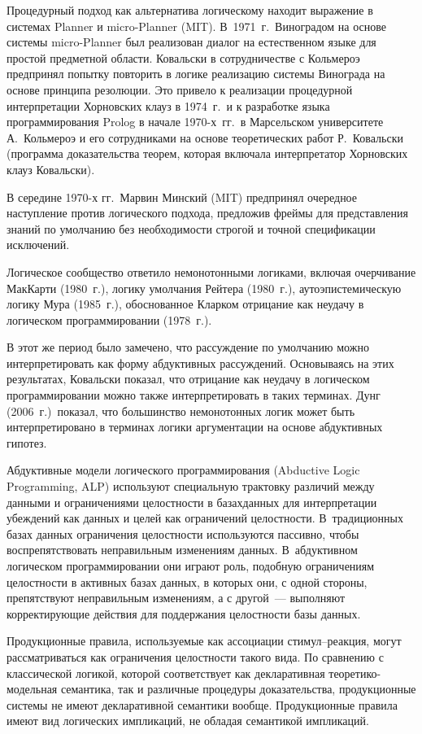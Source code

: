 \begin{multicols}{2}
Процедурный подход как альтернатива логическому находит выражение в системах Planner 
и micro-Planner (MIT). В~1971~г.\ Виноградом на основе системы micro-Planner был 
реализован диалог на естественном языке для простой предметной об\-ласти. Ковальски в 
сотрудничестве с Кольмероэ предпринял попытку повторить в логике реализацию 
системы Винограда на основе принципа резолюции. Это привело к реализации процедурной 
интерпретации Хорновских клауз в 1974~г.\ и к разработке языка программирования 
Prolog в начале 1970-х~гг.\ в Марсельском университете А.~Кольмероэ и его сотрудниками на 
основе теоретических работ Р.~Ковальски (программа доказательства теорем, которая 
включала интерпретатор Хорновских клауз Ковальски).

В середине 1970-х гг.\ Марвин Минский (MIT) предпринял очередное 
наступление против логического подхода, предложив фреймы для пред\-став\-ле\-ния знаний по 
умолчанию без необходимости строгой и точной спецификации исключений.

Логическое сообщество ответило немонотонными логиками, включая очерчивание 
МакКарти (1980~г.), логику умолчания Рейтера (1980~г.), аутоэпистемическую логику Мура 
(1985~г.), обоснованное Кларком отрицание как неудачу в логическом программировании 
(1978~г.).

В этот же период было замечено, что рассуждение по умолчанию можно интерпретировать 
как форму абдуктивных рассуждений. Основываясь на этих результатах, Ковальски показал, 
что отрицание как неудачу в логическом программировании можно также 
интерпретировать в таких терминах. Дунг (2006~г.)\ показал, что большинство 
немонотонных логик может быть интерпретировано в терминах логики аргументации на 
основе абдуктивных гипотез. 

Абдуктивные модели логического програм\-мирования 
(Abductive Logic Programming, ALP) 
используют специальную трактовку различий между данными и ограничениями 
целостности в базах\linebreak данных для интерпретации убеждений как данных и целей как 
ограничений целостности. В~традиционных базах данных ограничения целостности 
используются пассивно, чтобы воспрепятствовать неправильным изменениям данных. 
В~абдуктивном логическом программировании они играют роль, подобную ограничениям 
целостности в активных базах данных, в которых они, с одной стороны, препятствуют 
неправильным изменениям, а с другой~--- выполняют корректирующие действия для 
поддержания целостности базы данных. 

Продукционные правила, используемые как ассоциации стимул--реакция, могут 
рассматриваться как ограничения целостности такого вида. По сравнению с классической 
логикой, которой соответствует как декларативная теоретико-модельная семантика, так и 
различные процедуры доказательства, продукционные системы не имеют декларативной 
семантики вообще. Продукционные правила имеют вид логических импликаций, не обладая 
семантикой импликаций.


\end{multicols}
